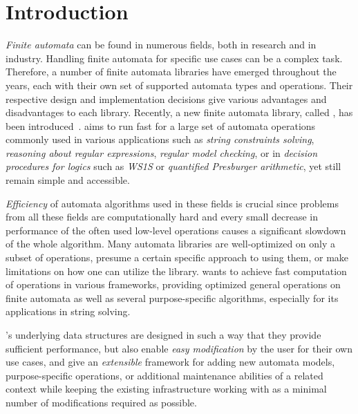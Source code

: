 
% 

\chapter{Introduction}

\emph{Finite automata} can be found in numerous fields, both in research and in industry.
Handling finite automata for specific use cases can be a complex task.
Therefore, a number of finite automata libraries have emerged throughout the years, each with their own set of supported automata types and operations.
Their respective design and implementation decisions give various advantages and disadvantages to each library.
Recently, a new finite automata library, called \mata, has been introduced~\cite{tacas24_mata_10.1007/978-3-031-57249-4_7}.
\mata aims to run fast for a large set of automata operations commonly used in various applications such as \emph{string constraints solving}, \emph{reasoning about regular expressions}, \emph{regular model checking}, or in \emph{decision procedures for logics} such as \emph{WS1S} or \emph{quantified Presburger arithmetic}, yet still remain simple and accessible.

\emph{Efficiency} of automata algorithms used in these fields is crucial since problems from all these fields are computationally hard and every small decrease in performance of the often used low-level operations causes a significant slowdown of the whole algorithm.
Many automata libraries are well-optimized on only a subset of operations, presume a certain specific approach to using them, or make limitations on how one can utilize the library.
\mata wants to achieve fast computation of operations in various frameworks, providing optimized general operations on finite automata as well as several purpose-specific algorithms, especially for its applications in string solving.

\mata's underlying data structures are designed in such a way that they provide sufficient performance, but also enable \emph{easy modification} by the user for their own use cases, and give an \emph{extensible} framework for adding new automata models, purpose-specific operations, or additional maintenance abilities of a related context while keeping the existing infrastructure working with as a minimal number of modifications required as possible.

